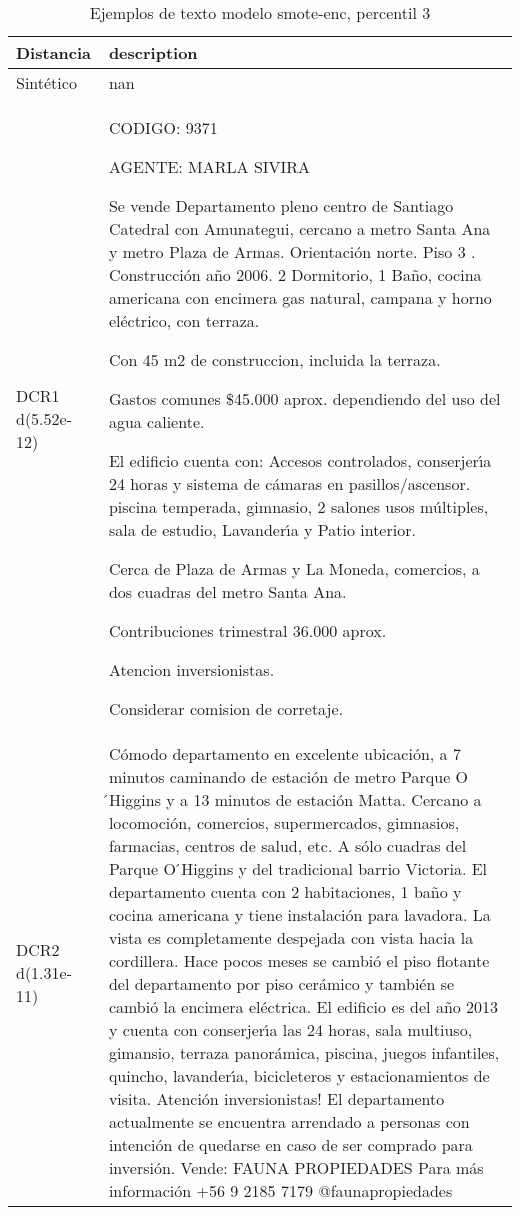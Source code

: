 \begin{table}[H]
\centering
\fontsize{10}{14}\selectfont
\caption{Ejemplos de texto modelo smote-enc, percentil 3}
\label{table-example-economicos-a-1-smote-enc-3p-text}
\begin{tabular}{|l|m{35em}|}
\hline
\rowcolor[gray]{0.8}
Distancia & description \\
\hline Sintético & nan \\
\hline DCR1 d(5.52e-12) & CODIGO: 9371

AGENTE: MARLA SIVIRA

Se vende Departamento pleno centro de Santiago Catedral con Amunategui, cercano a metro Santa Ana y metro Plaza de Armas. Orientaci\'on norte. Piso 3 . Construcci\'on a\~no 2006. 2 Dormitorio, 1 Ba\~no, cocina americana con encimera gas natural, campana y horno el\'ectrico, con terraza.

Con 45 m2 de construccion, incluida la terraza.

Gastos comunes \$45.000 aprox. dependiendo del uso del agua caliente.

El edificio cuenta con: Accesos controlados, conserjer{\'\i}a 24 horas y sistema de c\'amaras en pasillos/ascensor. piscina temperada, gimnasio, 2 salones usos m\'ultiples, sala de estudio, Lavander{\'\i}a y Patio interior.

Cerca de Plaza de Armas y La Moneda, comercios, a dos cuadras del metro Santa Ana.

Contribuciones trimestral 36.000 aprox.

Atencion inversionistas.

Considerar comision de corretaje. \\
\hline DCR2 d(1.31e-11) & C\'omodo departamento en excelente ubicaci\'on, a 7 minutos caminando de estaci\'on de metro Parque O ́Higgins y a 13 minutos de estaci\'on Matta. Cercano a locomoci\'on, comercios, supermercados, gimnasios, farmacias, centros de salud, etc. A s\'olo cuadras del Parque O ́Higgins y del tradicional barrio Victoria.  El departamento cuenta con 2 habitaciones, 1 ba\~no y cocina americana y tiene instalaci\'on para lavadora. La vista es completamente despejada con vista hacia la cordillera. Hace pocos meses se cambi\'o el piso flotante del departamento por piso cer\'amico y tambi\'en se cambi\'o la encimera el\'ectrica.  El edificio es del a\~no 2013 y cuenta con conserjer{\'\i}a las 24 horas, sala multiuso, gimansio, terraza panor\'amica, piscina, juegos infantiles, quincho, lavander{\'\i}a, bicicleteros y estacionamientos de visita.   Atenci\'on inversionistas! El departamento actualmente se encuentra arrendado a personas con intenci\'on de quedarse en caso de ser comprado para inversi\'on.  Vende: FAUNA PROPIEDADES Para m\'as informaci\'on +56 9 2185 7179 @faunapropiedades \\
\hline
\end{tabular}
\end{table}
